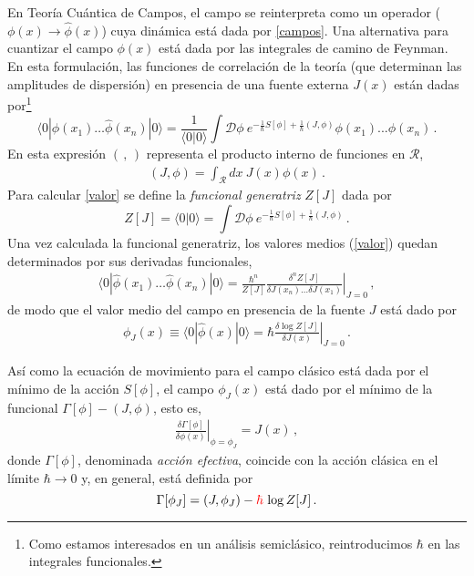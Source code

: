 En Teoría Cuántica de Campos, el campo se reinterpreta como un operador ($\phi(x) \rightarrow \hat{\phi}(x)$) cuya dinámica está dada por \eqref{campos}. Una alternativa para cuantizar el campo $\phi(x)$ está dada por las integrales de camino de Feynman. En esta formulación, las funciones de correlación de la teoría (que determinan las amplitudes de dispersión) en presencia de una fuente externa $J(x)$ están dadas por\footnote{\red Como estamos interesados en un análisis semiclásico, reintroducimos $\hbar$ en las integrales funcionales.}
\begin{equation}
\langle 0 | \hat{ \phi  } (x _1) \ldots \hat{\phi  } (x _n) | 0 \rangle = \frac{1}{\langle 0|0\rangle} 
\int  \mathscr D
\phi \ e ^{- \frac{1}{\hbar} S[ \phi ] + \frac{1}{\hbar} (J, \phi )} \phi (x _1) ... \phi (x _n)\,.
\label{valor}
\end{equation}
En esta expresión $(\,,\,) $ representa el producto interno de funciones en $\mathcal R$,
\begin{align}
	(J,\phi) = \int_\mathcal R dx\ J(x) \phi (x)\,.
\end{align}
Para calcular \eqref{valor} se define la {\it funcional generatriz} $Z[J]$ dada por
\begin{equation}
Z [J] = \langle0|0\rangle=
\int \mathscr D \phi \ e ^{- \frac{1}{ \hbar} S[ \phi ] + \frac{1}{\hbar} (J, \phi )}\,.
\label{eq.generatriz}
\end{equation}
Una vez calculada la funcional generatriz, los valores medios (\ref{valor}) quedan determinados por sus derivadas funcionales,
\begin{equation}
\begin{array}{c}
\langle 0 | \hat{ \phi  } (x _1) \ldots \hat{\phi  } (x _n) | 0 \rangle = \frac{\hbar ^n}{Z[J]}
\left. \frac{\delta ^n  Z[J] }{ \delta J(x_n) \ldots \delta J(x _1) } 		\right| _{J=0}\,,
\end{array}
\end{equation}
de modo que el valor medio del campo en presencia de la fuente $J$ está dado por
\begin{equation}
\begin{array}{c}
\phi _J (x) \equiv \langle 0| \hat{\phi } (x)| 0 \rangle = \hbar \left. \frac{\delta \log Z[J] }{\delta J(x)} \right| _{J=0} \,.
\end{array}
\end{equation}

Así como la ecuación de movimiento para el campo clásico está dada por el mínimo de la acción $S[\phi]$, el campo $ \phi _J (x) $ está dado por el mínimo de la funcional $\Gamma[\phi]-(J,\phi)$, esto es,
\begin{equation}
\begin{array}{c}
\left.\frac{\delta \Gamma [ \phi ]  }{\delta \phi (x)  }\right|_{\phi=\phi_J} = 
J (x)\,,
\end{array}
\label{eq.accion1}
\end{equation}
donde $\Gamma[\phi]$, denominada {\it acción efectiva}, coincide con la acción clásica en el límite $\hbar\to 0$ y, en general, está definida por
\begin{equation}
\Gamma [\phi _J] = (J, \phi _J) -{\color{red} \hbar}\, \log Z [J]\,.
\label{efectiva}
\end{equation}

